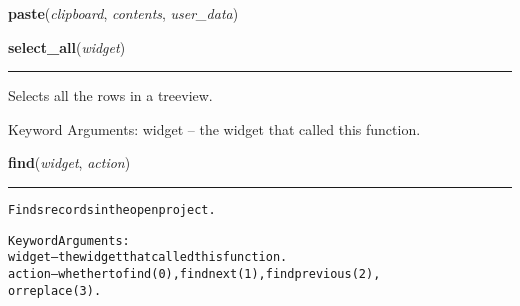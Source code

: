 \hspace{.8\funcindent}\begin{boxedminipage}{\funcwidth}

    \raggedright \textbf{paste}(\textit{clipboard}, \textit{contents}, \textit{user\_data})

\setlength{\parskip}{2ex}
\setlength{\parskip}{1ex}
    \end{boxedminipage}

    \label{reliafree:utilities:select_all}

    \vspace{0.5ex}

\hspace{.8\funcindent}\begin{boxedminipage}{\funcwidth}

    \raggedright \textbf{select\_all}(\textit{widget})

    \vspace{-1.5ex}

    \rule{\textwidth}{0.5\fboxrule}
\setlength{\parskip}{2ex}
    Selects all the rows in a treeview.

    Keyword Arguments: widget -- the widget that called this function.

\setlength{\parskip}{1ex}
    \end{boxedminipage}

    \label{reliafree:utilities:find}

    \vspace{0.5ex}

\hspace{.8\funcindent}\begin{boxedminipage}{\funcwidth}

    \raggedright \textbf{find}(\textit{widget}, \textit{action})

    \vspace{-1.5ex}

    \rule{\textwidth}{0.5\fboxrule}
\setlength{\parskip}{2ex}
\begin{alltt}
Finds records in the open project.

Keyword Arguments:
widget -- the widget that called this function.
action -- whether to find (0), find next (1), find previous (2),
          or replace(3).
\end{alltt}

\setlength{\parskip}{1ex}
    \end{boxedminipage}

